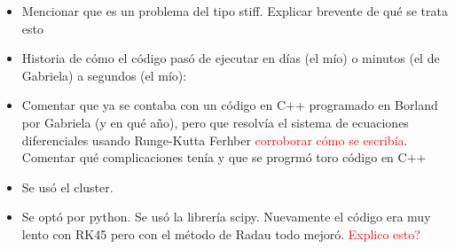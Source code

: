\documentclass[aps,prb,twocolumn,superscriptaddress,floatfix,longbibliography,10pt]{revtex4-2}
\begin{document}
\begin{itemize}
  \item Mencionar que es un problema del tipo stiff. Explicar brevente de qué se trata esto
  \item Historia de cómo el código pasó de ejecutar en días (el mío) o minutos (el de Gabriela) a segundos (el mío):
  \item Comentar que ya se contaba con un código en C++ programado en Borland por Gabriela (y en qué año), pero que resolvía el sistema de ecuaciones diferenciales usando Runge-Kutta Ferhber \textcolor{red}{corroborar cómo se escribía}. Comentar qué complicaciones tenía y que se progrmó toro código en C++
  \item Se usó el cluster.
  \item Se optó por python. Se usó la librería scipy. Nuevamente el código era muy lento con RK45 pero con el método de Radau todo mejoró. \textcolor{red}{Explico esto?}
\end{itemize}
\end{document}
